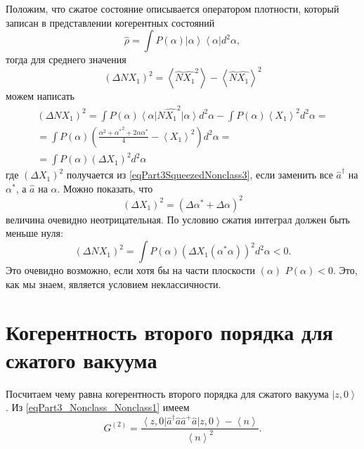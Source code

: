 Положим, что сжатое состояние описывается оператором плотности,
который записан в представлении когерентных состояний
\[
\hat{\rho} = \int P\left(\alpha\right)
\left|\alpha\right>
\left<\alpha\right| d^2 \alpha,
\]
тогда для среднего значения 
\begin{equation}
\left(\Delta N X_1\right)^2 = 
\left<\hat{N} \hat{X_1}^2\right> - \left<\hat{N} \hat{X_1}\right>^2 
\label{eqPart3SqueezedNonclass3}
\end{equation}
можем написать
\begin{eqnarray}
  \left(\Delta N X_1\right)^2 =
  \int P\left(\alpha\right)
  \left<\alpha\right|
  \hat{N} \hat{X_1}^2
  \left|\alpha\right> d^2 \alpha -
  \int P\left(\alpha\right)
  \left< X_1 \right>^2
  d^2 \alpha
  =
  \nonumber \\
  =
  \int  
  P\left(\alpha\right)
  \left(
  \frac{
    \alpha^2 + {\alpha^\ast}^2 +
    2 \alpha \alpha^\ast}{4}
  - \left< X_1 \right>^2
  \right)
   d^2 \alpha
  =
  \nonumber \\
  =
 \int 
P\left(\alpha\right)
\left(\Delta X_1\right)^2
d^2 \alpha
\end{eqnarray}
где $\left(\Delta X_1\right)^2$ получается из
\eqref{eqPart3SqueezedNonclass3}, если заменить все $\hat{a}^{\dag}$ на
$\alpha^{*}$, а $\hat{a}$ на $\alpha$. Можно показать, что
\[
\left(\Delta X_1\right)^2 = \left(\Delta \alpha^{*} + \Delta \alpha\right)^2
\]
величина очевидно неотрицательная. По условию сжатия интеграл должен
быть меньше нуля:
\begin{equation}
\left(\Delta N X_1\right)^2 = 
 \int 
P\left(\alpha\right)
\left(\Delta X_1\left(\alpha^{*}\alpha\right)\right)^2
d^2 \alpha < 0.
\nonumber
\end{equation}
Это очевидно возможно, если хотя бы на части плоскости
$\left(\alpha\right)$ $P\left(\alpha\right) < 0$. Это, как мы знаем,
является условием неклассичности. 

\section{Когерентность второго порядка для сжатого вакуума}

Посчитаем чему равна когерентность второго порядка для сжатого вакуума
$\left|z, 0\right>$. Из \eqref{eqPart3_Nonclass_Nonclass1} имеем
\[
G^{(2)} = \frac{\left<z,0\right|\hat{a}^{\dag}\hat{a}\hat{a}^{+}\hat{a}\left|z,0\right>
- \left<n\right>}{\left<n\right>^2}.
\]

